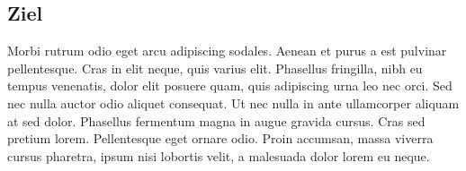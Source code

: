 \subsection{Ziel}

Morbi rutrum odio eget arcu adipiscing sodales. Aenean et purus a est pulvinar pellentesque. Cras in elit neque, quis varius elit. Phasellus fringilla, nibh eu tempus venenatis, dolor elit posuere quam, quis adipiscing urna leo nec orci. Sed nec nulla auctor odio aliquet consequat. Ut nec nulla in ante ullamcorper aliquam at sed dolor. Phasellus fermentum magna in augue gravida cursus. Cras sed pretium lorem. Pellentesque eget ornare odio. Proin accumsan, massa viverra cursus pharetra, ipsum nisi lobortis velit, a malesuada dolor lorem eu neque.